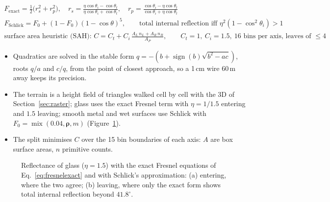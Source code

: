 \begin{gather}
F_{\text{exact}}=\tfrac12\big(r_s^2+r_p^2\big),\quad r_s=\frac{\eta\cos\theta_i-\cos\theta_t}{\eta\cos\theta_i+\cos\theta_t},\quad
r_p=\frac{\cos\theta_i-\eta\cos\theta_t}{\cos\theta_i+\eta\cos\theta_t}\label{eq:fresnelexact}\\
F_{\text{Schlick}}=F_0+(1-F_0)(1-\cos\theta)^5,\qquad \text{total internal reflection iff } \eta^2(1-\cos^2\theta_i)>1\nonumber\\
\text{surface area heuristic (SAH): } C=C_t+C_i\,\frac{A_L\,n_L+A_R\,n_R}{A_P},\qquad C_t=1,\ C_i=1.5,\ 16 \text{ bins per axis, leaves of }\le4\label{eq:sah}
\end{gather}
\begin{itemize}
\item Quadratics are solved in the stable form $q=-(b+\operatorname{sign}(b)\sqrt{b^2-ac})$, roots $q/a$ and $c/q$, from the point of
closest approach, so a 1\,cm wire 60\,m away keeps its precision.
\item The terrain is a height field of triangles walked cell by cell with the 3D  of Section~\ref{sec:raster}; glass uses
the exact Fresnel term with $\eta=1/1.5$ entering and $1.5$ leaving; smooth metal and wet surfaces use Schlick with
$F_0=\operatorname{mix}(0.04,\boldsymbol\rho,m)$ (Figure~\ref{fig:fresnel}).
\item The  split minimises $C$ over the 15 bin boundaries of each axis: $A$ are box surface areas, $n$ primitive counts.
\end{itemize}

\begin{figure}[htbp]
\centering{}
\caption{Reflectance of glass ($\eta=1.5$) with the exact Fresnel equations of Eq.~\eqref{eq:fresnelexact} and with
Schlick's approximation: (a) entering, where the two agree; (b) leaving, where only the exact form shows total internal
reflection beyond $41.8^\circ$.}
\label{fig:fresnel}
\end{figure}

